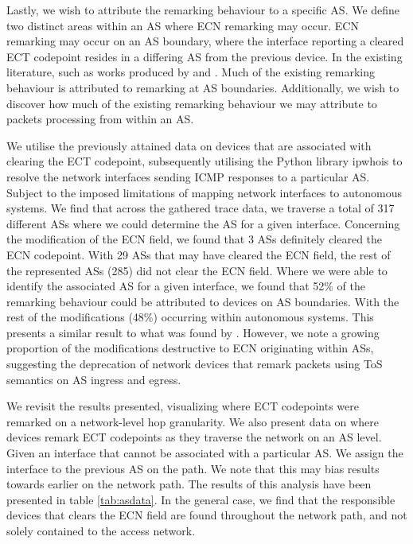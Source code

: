 \documentclass{l4proj}
\begin{document}
Lastly, we wish to attribute the remarking behaviour to a specific AS. We define two distinct areas within an AS where ECN remarking may occur. ECN remarking may occur on an AS boundary, where the interface reporting a cleared ECT codepoint resides in a differing AS from the previous device. In the existing literature, such as works produced by \cite{mcquistin_is_2015} and \cite{bauer_measuring_2011}. Much of the existing remarking behaviour is attributed to remarking at AS boundaries.
Additionally, we wish to discover how much of the existing remarking behaviour we may attribute to packets processing from within an AS.

We utilise the previously attained data on devices that are associated with clearing the ECT codepoint, subsequently utilising the Python library ipwhois to resolve the network interfaces sending ICMP responses to a particular AS. Subject to the imposed limitations of mapping network interfaces to autonomous systems\cite{mapping_accuracy}. We find that across the gathered trace data, we traverse a total of 317 different ASs where we could determine the AS for a given interface. Concerning the modification of the ECN field, we found that 3 ASs definitely cleared the ECN codepoint. With 29 ASs that may have cleared the ECN field, the rest of the represented ASs (285) did not clear the ECN field. Where we were able to identify the associated AS for a given interface, we found that 52\% of the remarking behaviour could be attributed to devices on AS boundaries. With the rest of the modifications (48\%) occurring within autonomous systems. This presents a similar result to what was found by \cite{mcquistin_is_2015}. However, we note a growing proportion of the modifications destructive to ECN originating within ASs, suggesting the deprecation of network devices that remark packets using ToS semantics on AS ingress and egress.

We revisit the results presented, visualizing where ECT codepoints were remarked on a network-level hop granularity. We also present data on where devices remark ECT codepoints as they traverse the network on an AS level. Given an interface that cannot be associated with a particular AS. We assign the interface to the previous AS on the path. We note that this may bias results towards earlier on the network path. The results of this analysis have been presented in table \ref{tab:asdata}. In the general case, we find that the responsible devices that clears the ECN field are found throughout the network path, and not solely contained to the access network.
\end{document}

